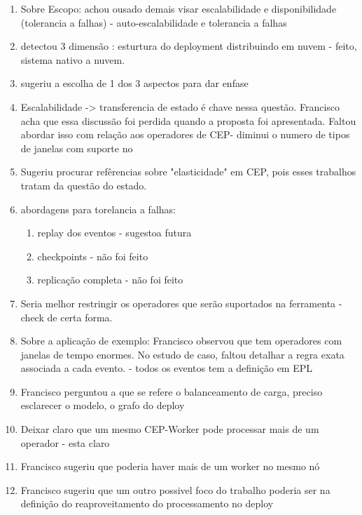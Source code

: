 \begin{enumerate}
\item Sobre Escopo: achou ousado demais visar escalabilidade e disponibilidade (tolerancia a falhas) - 
auto-escalabilidade e tolerancia a falhas 
\item detectou 3 dimensão : esturtura do deployment distribuindo em nuvem - feito, sistema nativo a nuvem. 
\item sugeriu a escolha de 1 dos 3 aspectos para dar enfase
\item Escalabilidade -> transferencia de estado é chave nessa questão. Francisco acha que essa discussão foi perdida quando a proposta foi apresentada. Faltou abordar isso com relação aos operadores de CEP- 
diminui o numero de tipos de janelas com suporte no 
\item Sugeriu procurar refêrencias sobre "elasticidade" em CEP, pois esses trabalhos tratam da questão do estado.
\item abordagens para torelancia a falhas: 
\begin{enumerate}
\item replay dos eventos - sugestoa futura
\item checkpoints - não foi feito
\item replicação completa - não foi feito
\end{enumerate}
\item Seria melhor restringir os operadores que serão suportados na ferramenta - check de certa forma. 
\item Sobre a aplicação de exemplo: Francisco observou que tem operadores com janelas de tempo enormes. No estudo de caso, faltou detalhar a regra exata associada a cada evento. - todos os eventos tem a definição em EPL
\item Francisco perguntou a que se refere o balanceamento de carga, preciso esclarecer o modelo, o grafo do deploy
\item Deixar claro que um mesmo CEP-Worker pode processar mais de um operador - esta claro
\item Francisco sugeriu que poderia haver mais de um worker no mesmo nó
\item Francisco sugeriu que um outro possivel foco do trabalho poderia ser na definição do reaproveitamento do processamento no deploy
\end{enumerate}










